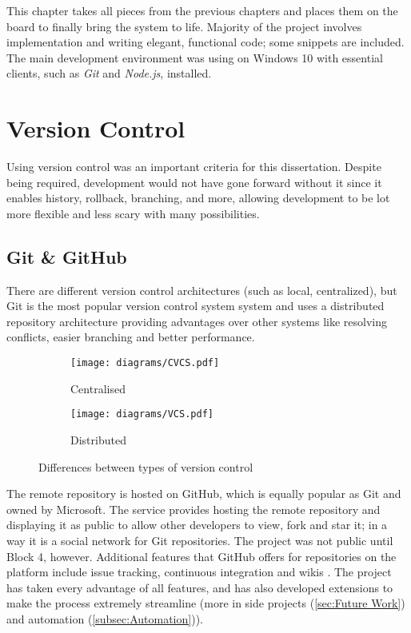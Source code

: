 \documentclass[../main.tex]{subfiles}
\begin{document}
This chapter takes all pieces from the previous chapters and places them on the board to finally bring the system to life. Majority of the project involves implementation and writing elegant, functional code; some snippets are included. The main development environment was using  on Windows 10 with essential clients, such as \textit{Git} and \textit{Node.js}, installed.

\section{Version Control}

Using version control was an important criteria for this dissertation. Despite being required, development would not have gone forward without it since it enables history, rollback, branching, and more, allowing development to be lot more flexible and less scary with many possibilities.

\subsection[Git]{Git \& GitHub}

There are different version control architectures (such as local, centralized), but Git is the most popular version control system system and uses a distributed repository architecture providing advantages over other systems like resolving conflicts, easier branching and better performance.

\begin{figure}
    \centering
    \noindent\begin{subfigure}{.48\textwidth}
    \centering
    \texttt{[image: diagrams/CVCS.pdf]}
    \caption{Centralised}%
    \end{subfigure}\hfill
    \begin{subfigure}{.48\textwidth}
    \centering
    \texttt{[image: diagrams/VCS.pdf]}
    \caption{Distributed}%
    \end{subfigure}
    \caption{Differences between types of version control}%
\end{figure}

The remote repository is hosted on GitHub, which is equally popular as Git and owned by Microsoft. The service provides hosting the remote repository and displaying it as public to allow other developers to view, fork and star it; in a way it is a social network for Git repositories. The project was not public until Block 4, however. Additional features that GitHub offers for repositories on the platform include issue tracking, continuous integration and wikis \cite{GitHubPoursEnergies}. The project has taken every advantage of all features, and has also developed extensions to make the process extremely streamline (more in side projects (\ref{sec:Future Work}) and automation (\ref{subsec:Automation})).
\end{document}

